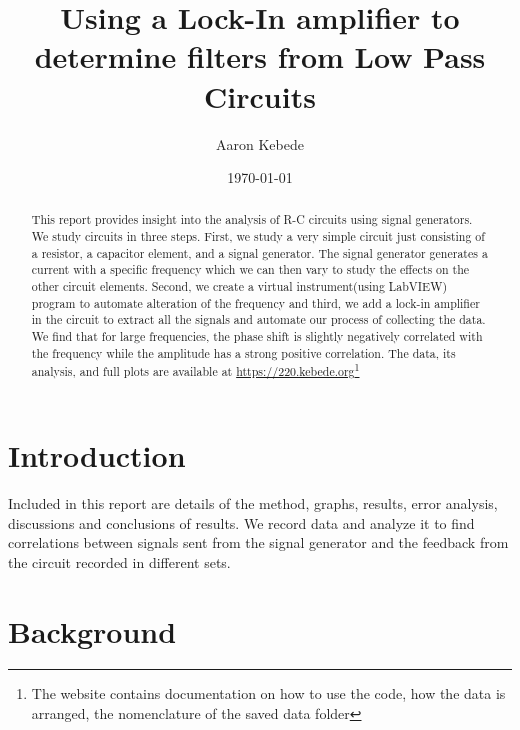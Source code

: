 \documentclass[twocolumn]{article}\usepackage[english]{babel}
\title{Using a Lock-In amplifier to determine filters from Low Pass Circuits}
\author{Aaron Kebede}
\date{\today}
\begin{document}
\maketitle
\begin{abstract}

This report provides insight into the analysis of R-C circuits using signal generators. We study circuits in three steps. First, we study a very simple circuit just consisting of a resistor, a capacitor element, and a signal generator. The signal generator generates a current with a specific frequency which we can then vary to study the effects on the other circuit elements. Second, we create a virtual instrument(using LabVIEW) program to automate alteration of the frequency and third, we add a lock-in amplifier in the circuit to extract all the signals and automate our process of collecting the data. We find that for large frequencies, the phase shift is slightly negatively correlated with the frequency while the amplitude has a strong positive correlation. The data, its analysis, and full plots are available at \url{https://220.kebede.org}\footnote{The website contains documentation on how to use the code, how the data is arranged, the nomenclature of the saved data folder}\cite{kebede_2021}

\end{abstract}

\section{Introduction}

Included in this report are details of the method, graphs, results, error analysis, discussions and conclusions of results. We record data and analyze it to find correlations between signals sent from the signal generator and the feedback from the circuit recorded in different sets.  
\newline

\section{Background}
\end{document}
